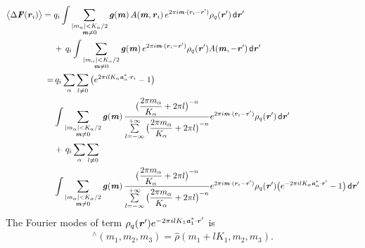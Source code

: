 \documentclass[aps,pre,preprint]{revtex4}
\renewcommand{\v}[1]{\textbf{\textit{#1}}}
\renewcommand{\d}[1]{\textsf{#1}}
\begin{document}
\begin{align}\nonumber
  \big\langle
  \Delta\v F(\v r_i)
  \big\rangle
  =\;&
  q_i
  \int 
  \sum_{
    \begin{subarray}{c}
      \vert m_{\alpha}\vert < K_\alpha/2\\
      \v m\neq 0
    \end{subarray}}
  \v g(\v m)\,
  A(\v m, \v r_i)\,
  e^{2\pi i\v m\cdot (\v r_i - \v r')}
  \rho_q(\v r')\,\d d\v r' \\ \nonumber
  & +\,
  q_i
  \int
  \sum_{
    \begin{subarray}{c}
      \vert m_{\alpha}\vert < K_\alpha/2\\
      \v m\neq 0
    \end{subarray}}
  \v g(\v m)\,
  e^{2\pi i\v m\cdot (\v r_i - \v r')}
  \rho_q(\v r')A(\v m, -\v r')\,\d d\v r' \\\nonumber
  = &\,
  q_i\sum_{\alpha}\sum_{l\neq 0}
  \big(
  e^{2\pi i l K_\alpha\v a^\ast_\alpha\cdot \v r_i} - 1
  \big) \\\nonumber
  &
  \int 
  \sum_{
    \begin{subarray}{c}
      \vert m_{\alpha}\vert < K_\alpha/2\\
      \v m\neq 0
    \end{subarray}}
  \v g(\v m)\,
  \frac
  {\big(\dfrac{2\pi m_\alpha}{K_\alpha} + 2\pi l\big)^{-n}}
  {\sum\limits_{l=-\infty}^{+\infty}
    \big(\dfrac{2\pi m_\alpha}{K_\alpha} + 2\pi l\big)^{-n}}
  e^{2\pi i\v m\cdot (\v r_i - \v r')}
  \rho_q(\v r')\,\d d\v r' \\ \nonumber
  &+ \,
  q_i\sum_{\alpha}\sum_{l\neq 0} \\ \nonumber
  &
  \int
  \sum_{
    \begin{subarray}{c}
      \vert m_{\alpha}\vert < K_\alpha/2\\
      \v m\neq 0
    \end{subarray}}
  \v g(\v m)\,
  \frac
  {\big(\dfrac{2\pi m_\alpha}{K_\alpha} + 2\pi l\big)^{-n}}
  {\sum\limits_{l=-\infty}^{+\infty}
    \big(\dfrac{2\pi m_\alpha}{K_\alpha} + 2\pi l\big)^{-n}}
  e^{2\pi i\v m\cdot (\v r_i - \v r')}
  \rho_q(\v r')
  \big(
  e^{-2\pi i l K_\alpha\v a^\ast_\alpha\cdot \v r'} - 1
  \big)
  \,\d d\v r' 
\end{align}
The Fourier modes of term $\rho_q(\v r')
e^{-2\pi i l K_1\v a^\ast_1\cdot \v r'}$ is
\begin{align}
  [\,\rho_q(\v r') e^{-2\pi i l K_1\v a^\ast_1\cdot \v r'}\,] ^\wedge
  (m_1, m_2, m_3)
  = \hat\rho(m_1+lK_1, m_2, m_3).
\end{align}
\end{document}

